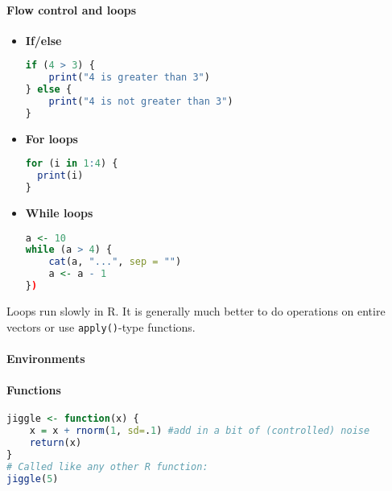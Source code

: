 \paragraph{Flow control and loops}
\begin{itemize}
\item \textbf{If/else}
\begin{lstlisting}[language={r}, style=snippet]
if (4 > 3) {
    print("4 is greater than 3")
} else {
    print("4 is not greater than 3")
}
\end{lstlisting}
\item \textbf{For loops}
\begin{lstlisting}[language={r}, style=snippet]
for (i in 1:4) {
  print(i)
}
\end{lstlisting}
\item \textbf{While loops}
\begin{lstlisting}[language={r}, style=snippet]
a <- 10
while (a > 4) {
    cat(a, "...", sep = "")
    a <- a - 1
})
\end{lstlisting}
\end{itemize}
Loops run slowly in R. It is generally much better to do operations on entire vectors or use \texttt{apply()}-type functions.

\paragraph{Environments}

\paragraph{Functions}

\begin{lstlisting}[language={r}, style=snippet]
jiggle <- function(x) {
    x = x + rnorm(1, sd=.1) #add in a bit of (controlled) noise
    return(x)
}
# Called like any other R function:
jiggle(5)
\end{lstlisting}

